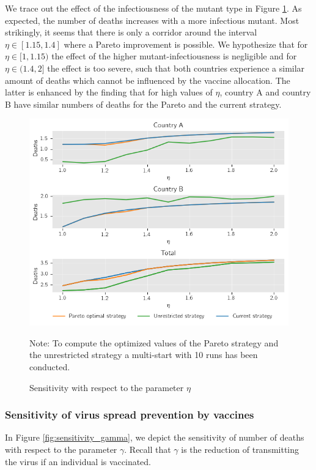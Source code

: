We trace out the effect of the infectiousness of the mutant type in Figure \ref{fig:sensitivity_eta}. As expected, the number of deaths increases with a more infectious mutant. Most strikingly, it seems that there is only a corridor around the interval $\eta \in [1.15, 1.4]$ where a Pareto improvement is possible. We hypothesize that for $\eta \in [1, 1.15)$ the effect of the higher mutant-infectiousness is negligible and for $\eta \in (1.4, 2]$ the effect is too severe, such that both countries experience a similar amount of deaths which cannot be influenced by the vaccine allocation. The latter is enhanced by the finding that for high values of $\eta$, country A and country B have similar numbers of deaths for the Pareto and the current strategy.
\begin{figure}[h!]
\centering
\includegraphics[scale=0.59]{images/sensitivity_eta.png}
\begin{flushleft}
\scriptsize{Note:} To compute the optimized values of the Pareto strategy and the unrestricted strategy a multi-start with 10 runs has been conducted.
\end{flushleft}
\caption{Sensitivity with respect to the parameter $\eta$}
\label{fig:sensitivity_eta}
\end{figure}



\subsubsection{Sensitivity of virus spread prevention by vaccines}
\label{A:gamma}
In Figure \ref{fig:sensitivity_gamma}, we depict the sensitivity of number of deaths with respect to the parameter $\gamma$. Recall that $\gamma$ is the reduction of transmitting the virus if an individual is vaccinated. 

